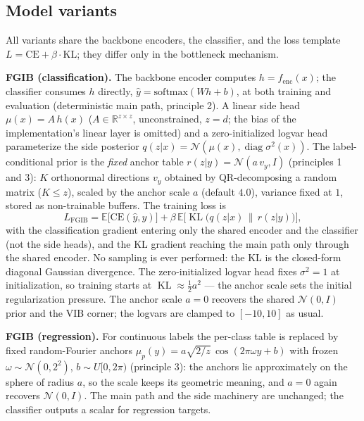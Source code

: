 \subsection{Model variants}

All variants share the backbone encoders, the classifier, and the loss template
$L = \mathrm{CE} + \beta \cdot \mathrm{KL}$; they differ only in the bottleneck mechanism.

\textbf{FGIB (classification).} The backbone encoder computes $h = f_{\mathrm{enc}}(x)$;
the classifier consumes $h$ directly, $\hat y = \mathrm{softmax}(W h + b)$, at both
training and evaluation (deterministic main path, principle 2). A linear side head
$\mu(x) = A\,h(x)$ ($A \in \mathbb{R}^{z \times z}$, unconstrained, $z = d$; the bias of
the implementation's linear layer is omitted) and a zero-initialized logvar head
parameterize the side posterior $q(z|x) = \mathcal{N}(\mu(x), \operatorname{diag}
\sigma^2(x))$. The label-conditional prior is the \emph{fixed} anchor table
$r(z|y) = \mathcal{N}(a\,v_y, I)$ (principles 1 and 3): $K$ orthonormal directions $v_y$
obtained by QR-decomposing a random matrix ($K \le z$), scaled by the anchor scale $a$
(default $4.0$), variance fixed at $1$, stored as non-trainable buffers. The training
loss is
\begin{equation}
L_{\mathrm{FGIB}} = \mathbb{E}\big[\mathrm{CE}(\hat y, y)\big]
+ \beta\,\mathbb{E}\big[\operatorname{KL}\big(q(z|x)\,\|\,r(z|y)\big)\big],
\label{eq:fgib-loss}
\end{equation}
with the classification gradient entering only the shared encoder and the classifier (not
the side heads), and the KL gradient reaching the main path only through the shared
encoder. No sampling is ever performed: the KL is the closed-form diagonal Gaussian
divergence. The zero-initialized logvar head fixes $\sigma^2 = 1$ at initialization, so
training starts at $\operatorname{KL} \approx \tfrac12 a^2$ --- the anchor scale sets the
initial regularization pressure. The anchor scale $a = 0$ recovers the shared
$\mathcal{N}(0, I)$ prior and the VIB corner; the logvars are clamped to $[-10, 10]$ as
usual.

\textbf{FGIB (regression).} For continuous labels the per-class table is replaced by
fixed random-Fourier anchors
$\mu_p(y) = a\sqrt{2/z}\,\cos(2\pi\omega y + b)$ with frozen
$\omega \sim \mathcal{N}(0, 2^2)$, $b \sim U[0, 2\pi)$ (principle 3): the anchors lie
approximately on the sphere of radius $a$, so the scale keeps its geometric meaning, and
$a = 0$ again recovers $\mathcal{N}(0, I)$. The main path and the side machinery are
unchanged; the classifier outputs a scalar for regression targets.

